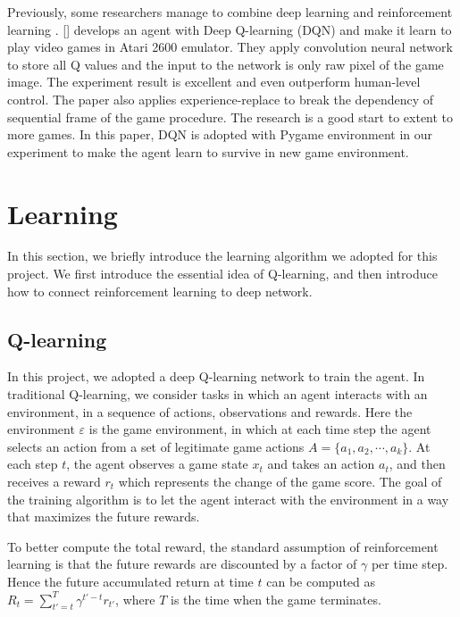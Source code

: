 \documentclass{acmsiggraph}
\begin{document}
Previously, some researchers manage to combine deep learning and reinforcement learning \cite{mnih2013playing,gu02015monte}. [] develops an agent with Deep Q-learning (DQN) and make it learn to play video games in Atari 2600 emulator. They apply convolution neural network to store all Q values and the input to the network is only raw pixel of the game image. The experiment result is excellent and even outperform human-level control. The paper also applies experience-replace to break the dependency of sequential frame of the game procedure. The research is a good start to extent to more games. In this paper, DQN is adopted with Pygame environment \cite{tasfi2016PLE} in our experiment to make the agent learn to survive in new game environment.



\section{Learning}
In this section, we briefly introduce the learning algorithm we adopted for this project. We first introduce the essential idea of Q-learning, and then introduce how to connect reinforcement learning to deep network.

\subsection{Q-learning}
In this project, we adopted a deep Q-learning network to train the agent. 
In traditional Q-learning, we consider tasks in which an agent interacts with an environment, in a sequence of actions, observations and rewards. Here the environment $\varepsilon$ is the game environment, in which at each time step the agent selects an action from a set of legitimate game actions $A = \{a_1, a_2, \cdots, a_k\}$. At each step $t$, the agent observes a game state $x_t$ and takes an action $a_t$, and then receives a reward $r_t$ which represents the change of the game score. The goal of the training algorithm is to let the agent interact with the environment in a way that maximizes the future rewards.

To better compute the total reward, the standard assumption of reinforcement learning is that the future rewards are discounted by a factor of $\gamma$ per time step. Hence the future accumulated return at time $t$ can be computed as $R_t = \sum_{t'=t}^T \gamma^{t'-t} r_{t'}$, where $T$ is the time when the game terminates.
\end{document}
